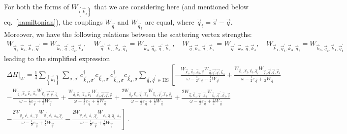 \documentclass{revtex4-2}
\begin{document}
For both the forms of \(W_{\left\{ \vec k_i \right\} }\) that we are considering here (and mentioned below eq.~\ref{hamiltonian}), the couplings \(W_{\vec q}\) and \(W_{\vec q_t}\) are equal, where \(\vec q_t = \vec \pi - \vec q\). Moreover, we have the following relations between the scattering vertex strengths:
\begin{equation}\begin{aligned}
	W_{\vec q_t,\vec k_4, \vec k_1, \vec q^\prime} = W_{\vec k_1, \vec q^\prime, \vec q_t,\vec k_4}, \quad W_{\vec q^\prime, \vec k_2, \vec k_3, \vec q_t} = W_{\vec k_3, \vec q_t, \vec q^\prime, \vec k_2}~,\quad W_{\vec q,\vec k_4, \vec q^\prime, \vec k_2}=W_{\vec q^\prime, \vec k_2,\vec q,\vec k_4},\quad W_{\vec k_1,\vec q_t^\prime, \vec k_3, \vec q_t}=W_{\vec k_3, \vec q_t,\vec k_1,\vec q_t^\prime}
\end{aligned}\end{equation}
leading to the simplified expression
\begin{equation}\begin{aligned}
	\Delta H\bigg|_{W} = \frac{1}{4}\sum_{\left\{ \vec k_i \right\}}\sum_{\sigma,\sigma^\prime} c^\dagger_{\vec k_1,\sigma^\prime}c_{\vec k_2,\sigma^\prime}c^\dagger_{\vec k_3,\sigma} c_{\vec k_4,\sigma} \sum_{\vec q, \vec q^\prime \in \text{HS}}\left[-\frac{W_{\vec k_1,\vec k_2,\vec k_3,\vec q} W_{\vec q,\vec{q^\prime},\vec{q^\prime},\vec k_4}}{\omega - \frac{1}{2}\varepsilon_{\vec q} + \frac{1}{2}W_{\vec q}} + \frac{W_{\vec k_1,\vec k_2,\vec k_3,\vec q_t} W_{\vec q_t,\vec{q^\prime},\vec{q^\prime},\vec k_4}}{\omega - \frac{1}{2}\varepsilon_{\vec q} + \frac{1}{2}W_{\vec q}} \right.\\
\left.- \frac{W_{\vec q_t,\vec k_4,\vec k_1,\vec k_2} W_{\vec k_3,\vec{q^\prime},\vec{q^\prime},\vec q_t}}{\omega - \frac{1}{2}\varepsilon_{\vec q} + \frac{1}{2}W_{\vec q}}
 + \frac{W_{\vec q,\vec k_4,\vec k_1,\vec k_2} W_{\vec k_3,\vec{q^\prime},\vec{q^\prime},\vec q}}{\omega - \frac{1}{2}\varepsilon_{\vec q} + \frac{1}{2}W_{\vec q}}
 + \frac{2W_{\vec q_t,\vec k_4, \vec q_t^\prime, \vec k_2} W_{\vec k_1,\vec q_t^\prime, \vec k_3, \vec q_t}}{\omega - \frac{1}{2}\varepsilon_{\vec q} + \frac{1}{2}W_{\vec q}} + \frac{2W_{\vec q,\vec k_4, \vec q^\prime, \vec k_2} W_{\vec k_1,\vec q^\prime, \vec k_3, \vec q}}{\omega - \frac{1}{2}\varepsilon_{\vec q} + \frac{1}{2}W_{\vec q}}\right.\\
\left. - \frac{2W_{\vec q_t,\vec k_4, \vec k_1, \vec q^\prime} W_{\vec q^\prime, \vec k_2, \vec k_3, \vec q_t}}{\omega - \frac{1}{2}\varepsilon_{\vec q}  + \frac{1}{2}W_{\vec q}} - \frac{2W_{\vec q,\vec k_4, \vec k_1, \vec q_t^\prime} W_{\vec k_3, \vec q, \vec q_t^\prime, \vec k_2}}{\omega - \frac{1}{2}\varepsilon_{\vec q}  + \frac{1}{2}W_{\vec q}}\right]~.
\end{aligned}\end{equation}
\end{document}
